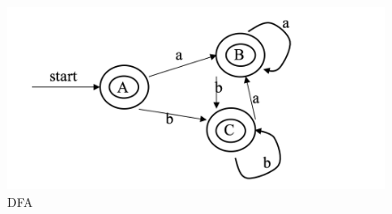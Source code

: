 \documentclass[12pt,a4paper]{article}
\begin{document}
\begin{enumerate}
\begin{enumerate}
    \textrm{\\}
    \begin{figure}[h]
    \center
    \includegraphics[width=0.8\linewidth]{sol5}\vspace{-10pt}
    \caption{DFA} \label{DFA}\vspace{-10pt}
    \end{figure}

    \end{enumerate}




\end{enumerate}
\end{document}
